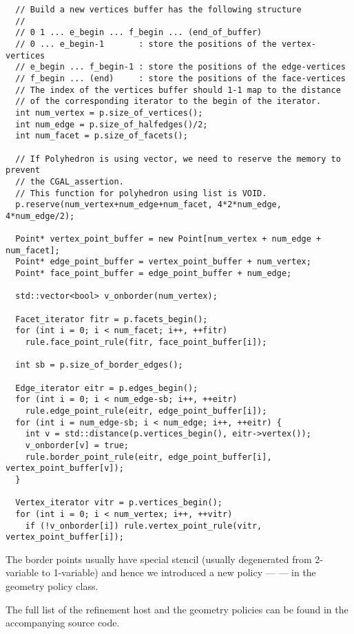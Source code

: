 \begin{lstlisting}
  // Build a new vertices buffer has the following structure
  //
  // 0 1 ... e_begin ... f_begin ... (end_of_buffer)
  // 0 ... e_begin-1       : store the positions of the vertex-vertices
  // e_begin ... f_begin-1 : store the positions of the edge-vertices
  // f_begin ... (end)     : store the positions of the face-vertices
  // The index of the vertices buffer should 1-1 map to the distance
  // of the corresponding iterator to the begin of the iterator.
  int num_vertex = p.size_of_vertices();
  int num_edge = p.size_of_halfedges()/2;
  int num_facet = p.size_of_facets();

  // If Polyhedron is using vector, we need to reserve the memory to prevent 
  // the CGAL_assertion.
  // This function for polyhedron using list is VOID.
  p.reserve(num_vertex+num_edge+num_facet, 4*2*num_edge, 4*num_edge/2);

  Point* vertex_point_buffer = new Point[num_vertex + num_edge + num_facet];
  Point* edge_point_buffer = vertex_point_buffer + num_vertex;
  Point* face_point_buffer = edge_point_buffer + num_edge;

  std::vector<bool> v_onborder(num_vertex);

  Facet_iterator fitr = p.facets_begin();
  for (int i = 0; i < num_facet; i++, ++fitr)
    rule.face_point_rule(fitr, face_point_buffer[i]);

  int sb = p.size_of_border_edges();

  Edge_iterator eitr = p.edges_begin();
  for (int i = 0; i < num_edge-sb; i++, ++eitr)
    rule.edge_point_rule(eitr, edge_point_buffer[i]);
  for (int i = num_edge-sb; i < num_edge; i++, ++eitr) {
    int v = std::distance(p.vertices_begin(), eitr->vertex());
    v_onborder[v] = true;
    rule.border_point_rule(eitr, edge_point_buffer[i], vertex_point_buffer[v]);
  }

  Vertex_iterator vitr = p.vertices_begin();
  for (int i = 0; i < num_vertex; i++, ++vitr)
    if (!v_onborder[i]) rule.vertex_point_rule(vitr, vertex_point_buffer[i]);
\end{lstlisting}

The border points usually have special stencil (usually degenerated from
2-variable to 1-variable) and hence we introduced a new policy ---
 --- in the geometry policy class.

The full list of the refinement host and the geometry policies can be 
found in the accompanying source code.

